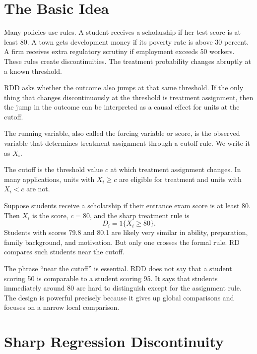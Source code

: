 \section{The Basic Idea}

Many policies use rules. A student receives a scholarship if her test score is at least 80. A town gets development money if its poverty rate is above 30 percent. A firm receives extra regulatory scrutiny if employment exceeds 50 workers. These rules create discontinuities. The treatment probability changes abruptly at a known threshold.

RDD asks whether the outcome also jumps at that same threshold. If the only thing that changes discontinuously at the threshold is treatment assignment, then the jump in the outcome can be interpreted as a causal effect for units at the cutoff.

\begin{defN}
The running variable, also called the forcing variable or score, is the observed variable that determines treatment assignment through a cutoff rule. We write it as $X_i$.
\end{defN}

\begin{defN}[Cutoff]
The cutoff is the threshold value $c$ at which treatment assignment changes. In many applications, units with $X_i \geq c$ are eligible for treatment and units with $X_i < c$ are not.
\end{defN}

\begin{exmp}
Suppose students receive a scholarship if their entrance exam score is at least 80. Then $X_i$ is the score, $c=80$, and the sharp treatment rule is
\[
    D_i = 1\{X_i \geq 80\}.
\]
Students with scores 79.8 and 80.1 are likely very similar in ability, preparation, family background, and motivation. But only one crosses the formal rule. RD compares such students near the cutoff.
\end{exmp}

The phrase ``near the cutoff'' is essential. RDD does not say that a student scoring 50 is comparable to a student scoring 95. It says that students immediately around 80 are hard to distinguish except for the assignment rule. The design is powerful precisely because it gives up global comparisons and focuses on a narrow local comparison.

\section{Sharp Regression Discontinuity}

